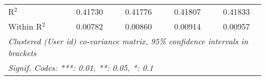 \begin{table}[htbp]
\begin{threeparttable}[b]
\begin{tabular}{lcccc}
         R$^2$                  & 0.41730         & 0.41776         & 0.41807          & 0.41833\\  
         Within R$^2$           & 0.00782         & 0.00860         & 0.00914          & 0.00957\\  
         \midrule \midrule
         \multicolumn{5}{l}{\emph{Clustered (User id) co-variance matrix, 95\% confidence intervals in brackets}}\\
         \multicolumn{5}{l}{\emph{Signif. Codes: ***: 0.01, **: 0.05, *: 0.1}}\\
      \end{tabular}
   \end{threeparttable}
\end{table}


